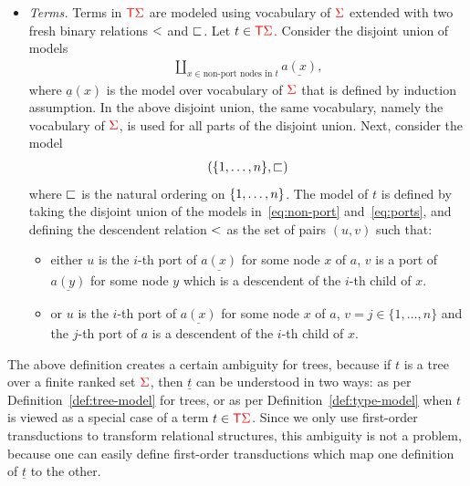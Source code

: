 \begin{definition}
\begin{itemize}
                
        \item \emph{Terms.}   Terms in ${\color{red}{\mathsf T}} {\color{red}{\Sigma}}$ are modeled using vocabulary of ${\color{red}{\Sigma}}$ extended with two fresh binary relations $<$ and $\sqsubset$. 
          Let $t \in {\color{red}{\mathsf T}} {\color{red}{\Sigma}}$. Consider the disjoint union of models
            \begin{align}\label{eq:non-port}
                 \coprod_{x \in \text{non-port nodes in $t$}} \underline{a(x)},
            \end{align}
         where  $\underline a(x)$ is the model over vocabulary of ${\color{red}{\Sigma}}$ that  is defined by induction assumption.   In the above  disjoint union, the same vocabulary, namely the vocabulary of ${\color{red}{\Sigma}}$,  is used  for all parts of the disjoint union. Next, consider  the model
            \begin{align}\label{eq:ports}
            (\{1,\ldots,n\}, \sqsubset)
            \end{align}
            where $\sqsubset$ is the natural ordering on $\{1,\ldots,n\}$. 
            The model of $t$ is defined by taking the disjoint union of the models in~\eqref{eq:non-port} and~\eqref{eq:ports}, and defining the descendent relation $<$ as the set of pairs $(u,v)$ such that:
            \begin{itemize}
            \item either $u$ is the $i$-th port of $\underline{a(x)}$ for some node $x$ of $a$, $v$ is a port of $\underline{a(y)}$ for some node $y$ which is a descendent of the $i$-th child of $x$.
            \item or $u$ is the $i$-th port of $\underline{a(x)}$ for some node $x$ of $a$, $v=j\in\{1,\dots,n\}$ and the $j$-th port of $a$ is a descendent of the $i$-th child of $x$.
            \end{itemize} 

    \end{itemize}
\end{definition}

The above  definition creates a certain ambiguity for trees, because if $t$ is a tree over a finite ranked set ${\color{red}{\Sigma}}$, then $\underline t$ can be understood in two ways: as per  Definition~\ref{def:tree-model} for trees, or as per Definition~\ref{def:type-model} when $t$ is viewed as a special case of a term $t \in {\color{red}{\mathsf T}} {\color{red}{\Sigma}}$. Since we only use first-order transductions to transform relational structures,  this ambiguity is not a problem, because one can easily define first-order transductions which map one definition of $\underline t$ to the other.


